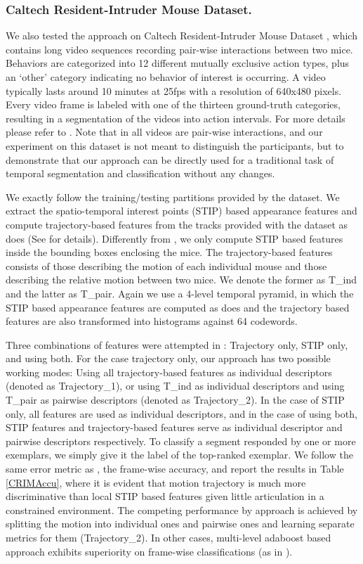 \subsubsection{Caltech Resident-Intruder Mouse Dataset.} 

We also tested the approach on Caltech Resident-Intruder Mouse Dataset \cite{CRIM13}, which contains long video sequences recording pair-wise interactions between two mice. Behaviors are categorized into 12 different mutually exclusive action types, plus an `other' category indicating no behavior of interest is occurring. A video typically lasts around 10 minutes at 25fps with a resolution of 640x480 pixels. Every video frame is labeled with one of the thirteen ground-truth categories, resulting in a segmentation of the videos
into action intervals. For more details please refer to \cite{CRIM13}. Note that in all videos are pair-wise interactions, and our experiment on this dataset is not meant to distinguish the participants, but to demonstrate that our approach can be directly used for a traditional task of temporal segmentation and classification without any changes.

We exactly follow the training/testing partitions provided by the dataset. We extract the spatio-temporal interest points (STIP) based appearance features and compute trajectory-based features from the tracks provided with the dataset as \cite{CRIM13} does (See \cite{CRIM13} for details). Differently from \cite{CRIM13}, we only compute STIP based features inside the bounding boxes enclosing the mice. The trajectory-based features consists of those describing the motion of each individual mouse and those describing the relative motion between two mice. We denote the former as T\_ind and the latter as T\_pair. Again we use a 4-level temporal pyramid, in which the STIP based appearance features are computed as \cite{CRIM13} does and the trajectory based features are also transformed into histograms against 64 codewords. 

Three combinations of features were attempted in \cite{CRIM13}: Trajectory only, STIP only, and using both. For the case trajectory only, our approach has two possible working modes: Using all trajectory-based features as individual descriptors (denoted as Trajectory\_1), or using T\_ind as individual descriptors and using T\_pair as pairwise descriptors (denoted as Trajectory\_2). In the case of STIP only, all features are used as individual descriptors, and in the case of using both, STIP features and trajectory-based features serve as individual descriptor and pairwise descriptors respectively. To classify a segment responded by one or more exemplars, we simply give it the label of the top-ranked exemplar. We follow the same error metric as \cite{CRIM13}, the frame-wise accuracy, and report the results in Table \ref{CRIMAccu}, where it is evident that motion trajectory is much more discriminative than local STIP based features given little articulation in a constrained environment. The competing performance by approach is achieved by splitting the motion into individual ones and pairwise ones and learning separate metrics for them (Trajectory\_2). In other cases, multi-level adaboost based approach exhibits superiority on frame-wise classifications (as in \cite{CRIM13}).


